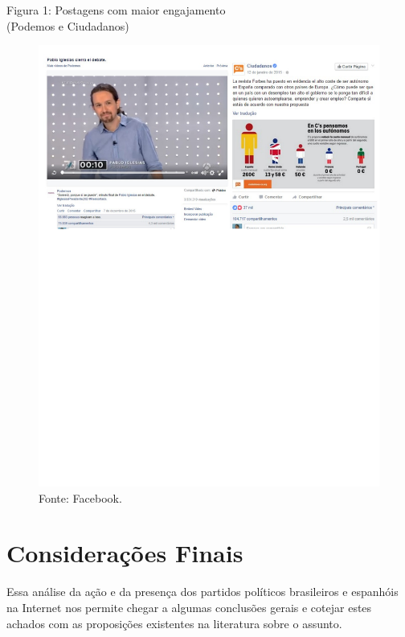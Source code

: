 \begin{center}
Figura 1: Postagens com maior engajamento\\ (Podemos e Ciudadanos)

\begin{figure}[!ht]
\centering
 \includegraphics[width=\textwidth]{./imgs/fig1.pdf}
\caption{Fonte: Facebook.}
\end{figure}
\end{center}


\section{Considerações Finais}

\noindent{}Essa análise da ação e da presença dos partidos políticos brasileiros e
espanhóis na Internet nos permite chegar a algumas conclusões gerais e
cotejar estes achados com as proposições existentes na literatura sobre
o assunto.

